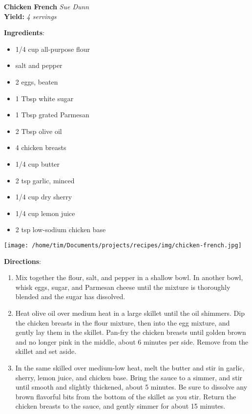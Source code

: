 \documentclass[11pt, twoside, openany]{book}
\begin{document}
\noindent\begin{minipage}[t]{\linewidth}%
{\Large\textbf{Chicken French}} \label{chicken-french}\hfill\textit{Sue Dunn}\\
\textbf{Yield:} \textit{4 servings}\\
\noindent\begin{minipage}[t]{0.78\linewidth}%
\textbf{Ingredients}:\vspace{-3mm}
\begin{multicols}{2}
\begin{itemize}\setlength\itemsep{-1mm}
\item 1/4 cup all-purpose flour
\item salt and pepper
\item 2 eggs, beaten
\item 1 Tbsp white sugar
\item 1 Tbsp grated Parmesan
\item 2 Tbsp olive oil
\item 4 chicken breasts
\item 1/4 cup butter
\item 2 tsp garlic, minced
\item 1/4 cup dry sherry
\item 1/4 cup lemon juice
\item 2 tsp low-sodium chicken base
\end{itemize}
\end{multicols}
\end{minipage}
\noindent\begin{minipage}[t]{0.18\linewidth}
\centering \strut\vspace*{-\baselineskip}\newline
\texttt{[image: /home/tim/Documents/projects/recipes/img/chicken-french.jpg]}\\
\end{minipage}\vspace{3mm}
\textbf{Directions}:
\vspace{-3mm}\begin{enumerate}\setlength\itemsep{-1mm}
\item Mix together the flour, salt, and pepper in a shallow bowl. In another bowl, whisk eggs, sugar, and Parmesan cheese until the mixture is thoroughly blended and the sugar has dissolved.
\item Heat olive oil over medium heat in a large skillet until the oil shimmers. Dip the chicken breasts in the flour mixture, then into the egg mixture, and gently lay them in the skillet. Pan-fry the chicken breasts until golden brown and no longer pink in the middle, about 6 minutes per side. Remove from the skillet and set aside.
\item In the same skilled over medium-low heat, melt the butter and stir in garlic, sherry, lemon juice, and chicken base. Bring the sauce to a simmer, and stir until smooth and slightly thickened, about 5 minutes. Be sure to dissolve any brown flavorful bits from the bottom of the skillet as you stir. Return the chicken breasts to the sauce, and gently simmer for about 15 minutes.
\end{enumerate}
\end{minipage}\vspace{8mm}
\end{document}
